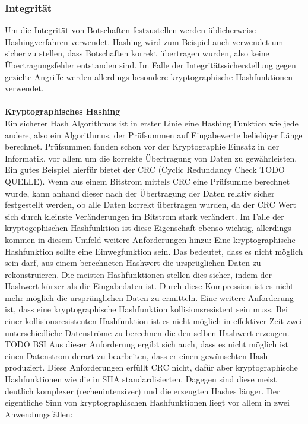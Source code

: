 \documentclass[13pt,a4paper,bibliography=totocnumbered,listof=totocnumbered]{scrartcl}
\begin{document}
\subsubsection{Integrität}
Um die Integrität von Botschaften festzustellen werden üblicherweise Hashingverfahren verwendet. Hashing wird zum Beispiel auch verwendet um sicher zu stellen, dass Botschaften korrekt übertragen wurden, also keine Übertragungsfehler entstanden sind. Im Falle der Integritätssicherstellung gegen gezielte Angriffe werden allerdings besondere kryptographische Hashfunktionen verwendet.\\
\\\textbf{Kryptographisches Hashing}\\
Ein sicherer Hash Algorithmus ist in erster Linie eine Hashing Funktion wie jede andere, also ein Algorithmus, der Prüfsummen auf Eingabewerte beliebiger Länge berechnet. Prüfsummen fanden schon vor der Kryptographie Einsatz in der Informatik, vor allem um die korrekte Übertragung von Daten zu gewährleisten. Ein gutes Beispiel hierfür bietet der CRC (Cyclic Redundancy Check TODO QUELLE). Wenn aus einem Bitstrom mittels CRC eine Prüfsumme berechnet wurde, kann anhand dieser nach der Übertragung der Daten relativ sicher festgestellt werden, ob alle Daten korrekt übertragen wurden, da der CRC Wert sich durch kleinste Veränderungen im Bitstrom stark verändert. Im Falle der kryptogephischen Hashfunktion ist diese Eigenschaft ebenso wichtig, allerdings kommen  in diesem Umfeld weitere Anforderungen hinzu: Eine kryptographische Hashfunktion sollte eine Einwegfunktion sein. Das bedeutet, dass es nicht möglich sein darf, aus einem berechneten Hashwert die ursprüglichen Daten zu rekonstruieren. Die meisten Hashfunktionen stellen dies sicher, indem der Hashwert kürzer als die Eingabedaten ist. Durch diese Kompression ist es nicht mehr möglich die ursprünglichen Daten zu ermitteln. Eine weitere Anforderung ist, dass eine kryptographische Hashfunktion kollisionsresistent sein muss. Bei einer kollisionsresistenten Hashfunktion ist es nicht möglich in effektiver Zeit zwei unterschiedliche Datenströme zu berechnen die den selben Hashwert erzeugen. TODO BSI \cite{12} Aus dieser Anforderung ergibt sich auch, dass es nicht möglich ist einen Datenstrom derart zu bearbeiten, dass er einen gewünschten Hash produziert. Diese Anforderungen erfüllt CRC nicht, dafür aber kryptographische Hashfunktionen wie die in SHA standardisierten. Dagegen sind diese meist deutlich komplexer (rechenintensiver) und die erzeugten Hashes länger. Der eigentliche Sinn von kryptographischen Hashfunktionen liegt vor allem in zwei Anwendungsfällen:\\
\end{document}
